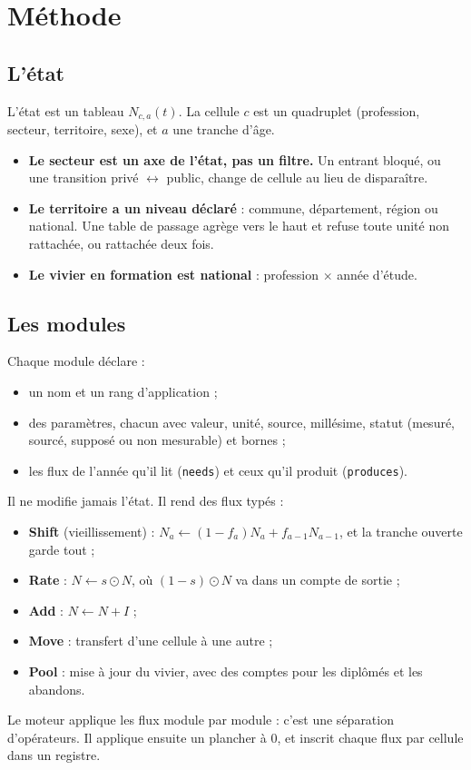 \section{Méthode}\label{a0-sec:methode}

\subsection{L'état}
L'état est un tableau $N_{c,a}(t)$. La cellule $c$ est un quadruplet (profession, secteur,
territoire, sexe), et $a$ une tranche d'âge.
\begin{itemize}
  \item \textbf{Le secteur est un axe de l'état, pas un filtre.} Un entrant bloqué, ou une transition
        privé $\leftrightarrow$ public, change de cellule au lieu de disparaître.
  \item \textbf{Le territoire a un niveau déclaré} : commune, département, région ou national. Une
        table de passage agrège vers le haut et refuse toute unité non rattachée, ou rattachée deux
        fois.
  \item \textbf{Le vivier en formation est national} : profession $\times$ année d'étude.
\end{itemize}

\subsection{Les modules}
Chaque module déclare :
\begin{itemize}
  \item un nom et un rang d'application ;
  \item des paramètres, chacun avec valeur, unité, source, millésime, statut (mesuré, sourcé, supposé
        ou non mesurable) et bornes ;
  \item les flux de l'année qu'il lit (\texttt{needs}) et ceux qu'il produit (\texttt{produces}).
\end{itemize}
Il ne modifie jamais l'état. Il rend des flux typés :
\begin{itemize}
  \item \textbf{Shift} (vieillissement) :
        $N_a \leftarrow (1-f_a)N_a + f_{a-1}N_{a-1}$, et la tranche ouverte garde tout ;
  \item \textbf{Rate} : $N \leftarrow s \odot N$, où $(1-s)\odot N$ va dans un compte de sortie ;
  \item \textbf{Add} : $N \leftarrow N + I$ ;
  \item \textbf{Move} : transfert d'une cellule à une autre ;
  \item \textbf{Pool} : mise à jour du vivier, avec des comptes pour les diplômés et les abandons.
\end{itemize}
Le moteur applique les flux module par module : c'est une séparation d'opérateurs. Il applique
ensuite un plancher à 0, et inscrit chaque flux par cellule dans un registre.

